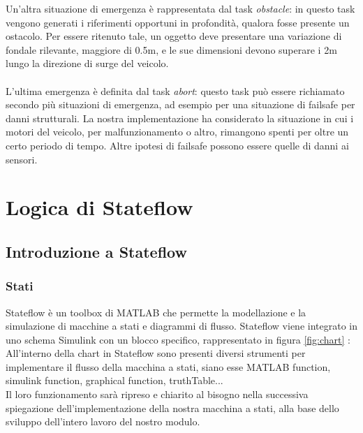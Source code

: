 \documentclass{article}
\begin{document}
            Un'altra situazione di emergenza è rappresentata dal task \emph{obstacle}: in questo task vengono generati i riferimenti opportuni in profondità, 
            qualora fosse presente un ostacolo. Per essere ritenuto tale, un oggetto deve presentare una variazione di fondale rilevante, maggiore di 0.5m,
            e le sue dimensioni devono superare i 2m lungo la direzione di surge del veicolo.\\ %
            \\
            L'ultima emergenza è definita dal task \emph{abort}: questo task può essere richiamato secondo più situazioni di emergenza, ad esempio per
            una situazione di failsafe per danni strutturali. La nostra implementazione ha considerato la situazione in cui i motori del veicolo, 
            per malfunzionamento o altro, rimangono spenti per oltre un certo periodo di tempo.
            Altre ipotesi di failsafe possono essere quelle di danni ai sensori.

    \newpage
    \section{Logica di Stateflow}

        \subsection{Introduzione a Stateflow}

            \subsubsection{Stati}
                Stateflow è un toolbox di MATLAB che permette la modellazione e la simulazione di
                macchine a stati e diagrammi di flusso. \cite{stateflow}
                Stateflow viene integrato in uno schema Simulink con un blocco specifico, rappresentato in figura \ref{fig:chart} :\\
                All'interno della chart in Stateflow sono presenti diversi strumenti per implementare il flusso della macchina
                a stati, siano esse MATLAB function, simulink function, graphical function, truthTable... \\
                Il loro funzionamento sarà ripreso e chiarito al bisogno nella successiva 
                spiegazione dell'implementazione della nostra macchina a stati, alla base dello sviluppo dell'intero lavoro del nostro modulo.\\
\end{document}
